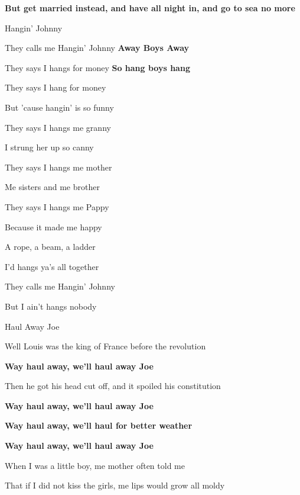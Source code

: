 \documentclass[letterpaper,9pt]{article}
\begin{document}
\textbf{But get married instead, and have all night in, and go to sea no more}


\newpage
{}
\Huge
Hangin' Johnny

\hfill

\huge
They calls me Hangin' Johnny \textbf{Away Boys Away}

They says I hangs for money \textbf{So hang boys hang}

\hfill

They says I hang for money

But 'cause hangin' is so funny

\hfill

They says I hangs me granny

I strung her up so canny

\hfill

They says I hangs me mother

Me sisters and me brother

\hfill

They says I hangs me Pappy

Because it made me happy

\hfill

A rope, a beam, a ladder

I'd hangs ya's all together

\hfill

They calls me Hangin' Johnny

But I ain't hangs nobody

\newpage
{}
\Huge
Haul Away Joe\\

\huge

Well Louis was the king of France before the revolution

\textbf{Way haul away, we'll haul away Joe}

Then he got his head cut off, and it spoiled his constitution

\textbf{Way haul away, we'll haul away Joe
}

\textbf{Way haul away, we'll haul for better weather
}

\textbf{Way haul away, we'll haul away Joe}

\hfill

When I was a little boy, me mother often told me

That if I did not kiss the girls, me lips would grow all moldy
\end{document}
